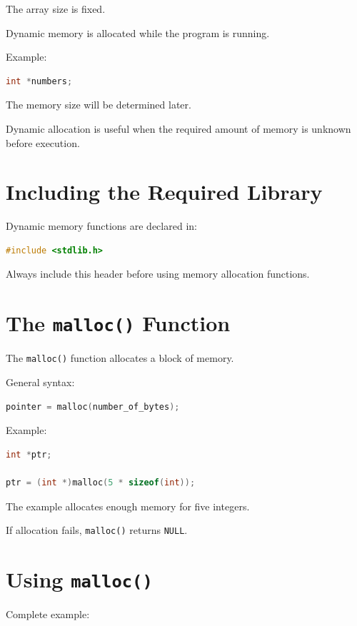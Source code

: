 \documentclass[12pt,openany]{book}
\begin{document}
The array size is fixed.

Dynamic memory is allocated while the program is running.

Example:

\begin{lstlisting}[language=C]
int *numbers;
\end{lstlisting}

The memory size will be determined later.

Dynamic allocation is useful when the required amount of memory is unknown before execution.

\section{Including the Required Library}

Dynamic memory functions are declared in:

\begin{lstlisting}[language=C]
#include <stdlib.h>
\end{lstlisting}

Always include this header before using memory allocation functions.

\section{The \texttt{malloc()} Function}

The \texttt{malloc()} function allocates a block of memory.

General syntax:

\begin{lstlisting}[language=C]
pointer = malloc(number_of_bytes);
\end{lstlisting}

Example:

\begin{lstlisting}[language=C]
int *ptr;

ptr = (int *)malloc(5 * sizeof(int));
\end{lstlisting}

The example allocates enough memory for five integers.

If allocation fails, \texttt{malloc()} returns \texttt{NULL}.
\section{Using \texttt{malloc()}}

Complete example:
\end{document}
